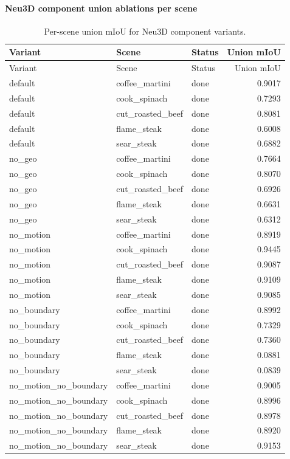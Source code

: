 \documentclass[10pt]{article}
\begin{document}
\paragraph{Neu3D component union ablations per scene}
\small
\begin{longtable}{lllr}
\caption{Per-scene union mIoU for Neu3D component variants.}\\
\toprule
Variant & Scene & Status & Union mIoU \\
\midrule
\endfirsthead
\toprule
Variant & Scene & Status & Union mIoU \\
\midrule
\endhead
default & coffee\_martini & done & 0.9017 \\
default & cook\_spinach & done & 0.7293 \\
default & cut\_roasted\_beef & done & 0.8081 \\
default & flame\_steak & done & 0.6008 \\
default & sear\_steak & done & 0.6882 \\
no\_geo & coffee\_martini & done & 0.7664 \\
no\_geo & cook\_spinach & done & 0.8070 \\
no\_geo & cut\_roasted\_beef & done & 0.6926 \\
no\_geo & flame\_steak & done & 0.6631 \\
no\_geo & sear\_steak & done & 0.6312 \\
no\_motion & coffee\_martini & done & 0.8919 \\
no\_motion & cook\_spinach & done & 0.9445 \\
no\_motion & cut\_roasted\_beef & done & 0.9087 \\
no\_motion & flame\_steak & done & 0.9109 \\
no\_motion & sear\_steak & done & 0.9085 \\
no\_boundary & coffee\_martini & done & 0.8992 \\
no\_boundary & cook\_spinach & done & 0.7329 \\
no\_boundary & cut\_roasted\_beef & done & 0.7360 \\
no\_boundary & flame\_steak & done & 0.0881 \\
no\_boundary & sear\_steak & done & 0.0839 \\
no\_motion\_no\_boundary & coffee\_martini & done & 0.9005 \\
no\_motion\_no\_boundary & cook\_spinach & done & 0.8996 \\
no\_motion\_no\_boundary & cut\_roasted\_beef & done & 0.8978 \\
no\_motion\_no\_boundary & flame\_steak & done & 0.8920 \\
no\_motion\_no\_boundary & sear\_steak & done & 0.9153 \\
\bottomrule
\end{longtable}
\normalsize
\end{document}
